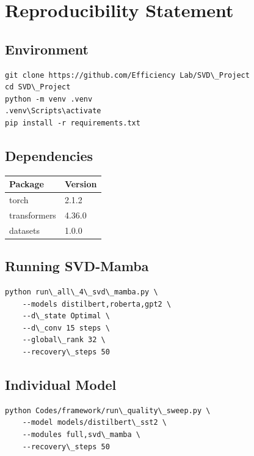 
\section{Reproducibility Statement}

\subsection{Environment}

\begin{lstlisting}
git clone https://github.com/Efficiency Lab/SVD\_Project
cd SVD\_Project
python -m venv .venv
.venv\Scripts\activate
pip install -r requirements.txt
\end{lstlisting}

\subsection{Dependencies}

\begin{table}[H]
\centering
\small
\begin{tabular}{ll}
\toprule
\textbf{Package} & \textbf{Version} \\
\midrule
torch & 2.1.2 \\
transformers & 4.36.0 \\
datasets & 1.0.0 \\
\bottomrule
\end{tabular}
\end{table}

\subsection{Running SVD-Mamba}

\begin{lstlisting}
python run\_all\_4\_svd\_mamba.py \
    --models distilbert,roberta,gpt2 \
    --d\_state Optimal \
    --d\_conv 15 steps \
    --global\_rank 32 \
    --recovery\_steps 50
\end{lstlisting}

\subsection{Individual Model}

\begin{lstlisting}
python Codes/framework/run\_quality\_sweep.py \
    --model models/distilbert\_sst2 \
    --modules full,svd\_mamba \
    --recovery\_steps 50
\end{lstlisting}

